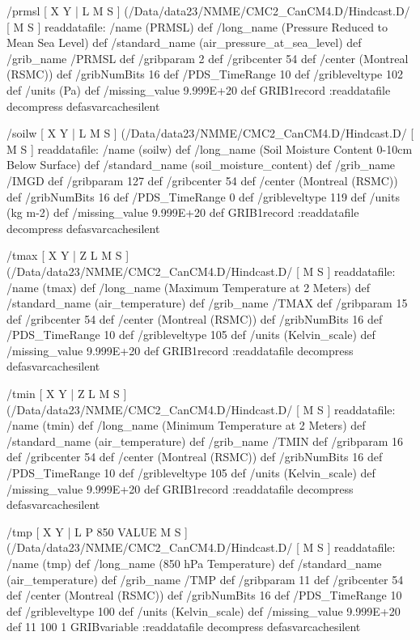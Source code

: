\begin{ingrid}
/prmsl {
[ X Y | L M S ]
(/Data/data23/NMME/CMC2_CanCM4.D/Hindcast.D/%
[ M S ]
readdatafile: 
/name (PRMSL) def
/long_name (Pressure Reduced to Mean Sea Level) def
/standard_name (air_pressure_at_sea_level) def
/grib_name /PRMSL def
/gribparam 2 def
/gribcenter 54 def
/center (Montreal (RSMC)) def
/gribNumBits 16 def
/PDS_TimeRange 10 def
/gribleveltype 102 def
/units (Pa) def
/missing_value 9.999E+20 def
GRIB1record
:readdatafile decompress
} defasvarcachesilent

/soilw {
[ X Y | L M S ]
(/Data/data23/NMME/CMC2_CanCM4.D/Hindcast.D/%
[ M S ]
readdatafile: 
/name (soilw) def
/long_name (Soil Moisture Content 0-10cm Below Surface) def
/standard_name (soil_moisture_content) def
/grib_name /IMGD def
/gribparam 127 def
/gribcenter 54 def
/center (Montreal (RSMC)) def
/gribNumBits 16 def
/PDS_TimeRange 0 def
/gribleveltype 119 def
/units (kg m-2) def
/missing_value 9.999E+20 def
GRIB1record
:readdatafile decompress
} defasvarcachesilent

/tmax {
[ X Y | Z L M S ] (/Data/data23/NMME/CMC2_CanCM4.D/Hindcast.D/%
[ M S ]
readdatafile: 
/name (tmax) def
/long_name (Maximum Temperature at 2 Meters) def
/standard_name (air_temperature) def
/grib_name /TMAX def
/gribparam 15 def
/gribcenter 54 def
/center (Montreal (RSMC)) def
/gribNumBits 16 def
/PDS_TimeRange 10 def
/gribleveltype 105 def
/units (Kelvin_scale) def
/missing_value 9.999E+20 def
GRIB1record
:readdatafile decompress
} defasvarcachesilent

/tmin {
[ X Y | Z L M S ] (/Data/data23/NMME/CMC2_CanCM4.D/Hindcast.D/%
[ M S ]
readdatafile: 
/name (tmin) def
/long_name (Minimum Temperature at 2 Meters) def
/standard_name (air_temperature) def
/grib_name /TMIN def
/gribparam 16 def
/gribcenter 54 def
/center (Montreal (RSMC)) def
/gribNumBits 16 def
/PDS_TimeRange 10 def
/gribleveltype 105 def
/units (Kelvin_scale) def
/missing_value 9.999E+20 def
GRIB1record
:readdatafile decompress
} defasvarcachesilent

/tmp {
[ X Y | L P 850 VALUE M S ]
(/Data/data23/NMME/CMC2_CanCM4.D/Hindcast.D/%
[ M S ]
readdatafile: 
/name (tmp) def
/long_name (850 hPa Temperature) def
/standard_name (air_temperature) def
/grib_name /TMP def
/gribparam 11 def
/gribcenter 54 def
/center (Montreal (RSMC)) def
/gribNumBits 16 def
/PDS_TimeRange 10 def
/gribleveltype 100 def
/units (Kelvin_scale) def
/missing_value 9.999E+20 def
11 100 1 GRIBvariable
:readdatafile decompress
} defasvarcachesilent


\end{ingrid}
